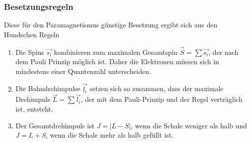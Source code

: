 \subsubsection{Besetzungsregeln}
Diese für den Paramagnetismus günstige Besetzung ergibt sich aus den Hundschen Regeln
\begin{enumerate}
    \item{ Die Spins $\vec{s_i}$ kombinieren zum maximalen Gesamtspin $\vec{S}=\sum\vec{s_i}$, der nach dem Pauli
    Prinzip möglich ist. Daher die Elektronen müssen sich in mindestens einer Quantenzahl unterscheiden.}
    \item Die Bahndrehimpulse $\vec{l_i}$ setzen sich so zusammen, dass der maximale Drehimpuls 
    $\vec{L}=\sum\vec{l_i}$, der mit dem Pauli-Prinzip und der Regel verträglich ist, entsteht.
    \item Der Gesamtdrehimpuls ist $J= \left|L-S\right|$, wenn die Schale weniger als halb und 
    $J=L+S$, wenn die Schale mehr als halb gefüllt ist.
    \label{Hundsche_Regel}
\end{enumerate}
